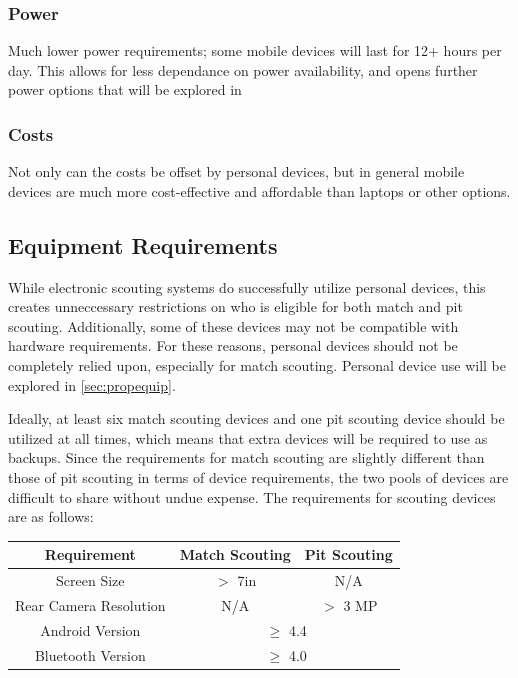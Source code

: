 \documentclass[11pt]{report}
\begin{document}
\subsubsection*{Power}

Much lower power requirements; some mobile devices will last for 12+ hours per day. This allows for less dependance on power availability, and opens further power options that will be explored in \

\subsubsection*{Costs}

Not only can the costs be offset by personal devices, but in general mobile devices are much more cost-effective and affordable than laptops or other options.


\subsection{Equipment Requirements}

While electronic scouting systems do successfully utilize personal devices, this creates unneccessary restrictions on who is eligible for both match and pit scouting. Additionally, some of these devices may not be compatible with hardware requirements. For these reasons, personal devices should not be completely relied upon, especially for match scouting. Personal device use will be explored in \autoref{sec:propequip}. \newline

Ideally, at least six match scouting devices and one pit scouting device should be utilized at all times, which means that extra devices will be required to use as backups. Since the requirements for match scouting are slightly different than those of pit scouting in terms of device requirements, the two pools of devices are difficult to share without undue expense. The requirements for scouting devices are as follows: 

\begin{center}
 \begin{tabular}{||c|c|c||} 
 \hline
 Requirement & Match Scouting & Pit Scouting \\  [0.5ex] 
 \hline \hline
 Screen Size & $>$ 7in & N/A \\ 
 \hline
 Rear Camera Resolution & N/A & $>$ 3 MP \\ 
 \hline
 Android Version & \multicolumn{2}{|c||}{$\geq$ 4.4}  \\
 \hline
 Bluetooth Version & \multicolumn{2}{|c||}{$\geq$ 4.0} \\  [1ex] 
 \hline
\end{tabular}
\end{center}
\end{document}
